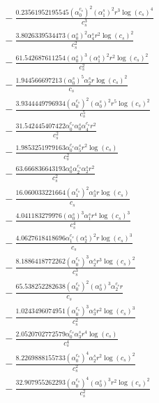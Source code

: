 \documentclass[10pt]{article}
\begin{document}
\begin{align*}
&{}  - \frac{0.23561952195545 \left(\alpha_{0}^{c_s}\right)^{2} \left(\alpha_{1}^s\right)^{2} r^{3} \log{\left(c_{s} \right)}^{4}}{c_{s}^{3}} \\
&{}  - \frac{3.8026339534473 \left(\alpha_{0}^s\right)^{2} \alpha_{4}^s r^{2} \log{\left(c_{s} \right)}^{2}}{c_{s}^{2}} \\
&{}  - \frac{61.542687611254 \left(\alpha_{0}^s\right)^{3} \left(\alpha_{1}^s\right)^{2} r^{2} \log{\left(c_{s} \right)}^{2}}{c_{s}^{2}} \\
&{}  - \frac{1.944566697213 \left(\alpha_{0}^s\right)^{5} \alpha_{2}^s r \log{\left(c_{s} \right)}^{2}}{c_{s}} \\
&{}  - \frac{3.9344449796934 \left(\alpha_{0}^{c_s}\right)^{2} \left(\alpha_{0}^s\right)^{2} r^{5} \log{\left(c_{s} \right)}^{2}}{c_{s}^{5}} \\
&{}  - \frac{31.542445407422 \alpha_{0}^{c_s} \alpha_{0}^s \alpha_{4}^{c_s} r^{2}}{c_{s}^{2}} \\
&{}  - \frac{1.9853251979163 \alpha_{0}^{c_s} \alpha_{5}^s r^{2} \log{\left(c_{s} \right)}}{c_{s}^{2}} \\
&{}  - \frac{63.666836643193 \alpha_{0}^s \alpha_{2}^{c_s} \alpha_{2}^s r^{2}}{c_{s}^{2}} \\
&{}  - \frac{16.060033221664 \left(\alpha_{1}^{c_s}\right)^{2} \alpha_{3}^s r \log{\left(c_{s} \right)}}{c_{s}} \\
&{}  - \frac{4.041183279976 \left(\alpha_{0}^s\right)^{3} \alpha_{1}^s r^{4} \log{\left(c_{s} \right)}^{3}}{c_{s}^{4}} \\
&{}  - \frac{4.0627618418696 \alpha_{1}^{c_s} \left(\alpha_{2}^s\right)^{2} r \log{\left(c_{s} \right)}^{3}}{c_{s}} \\
&{}  - \frac{8.1886418772262 \left(\alpha_{0}^{c_s}\right)^{3} \alpha_{2}^s r^{3} \log{\left(c_{s} \right)}^{2}}{c_{s}^{3}} \\
&{}  - \frac{65.538252282638 \left(\alpha_{0}^{c_s}\right)^{2} \left(\alpha_{0}^s\right)^{3} \alpha_{2}^{c_s} r}{c_{s}} \\
&{}  - \frac{1.0243496074951 \left(\alpha_{0}^{c_s}\right)^{3} \alpha_{3}^s r^{2} \log{\left(c_{s} \right)}^{3}}{c_{s}^{2}} \\
&{}  - \frac{2.0520702772579 \alpha_{0}^{c_s} \alpha_{3}^s r^{4} \log{\left(c_{s} \right)}}{c_{s}^{4}} \\
&{}  - \frac{8.2269888155733 \left(\alpha_{0}^{c_s}\right)^{4} \alpha_{2}^s r^{2} \log{\left(c_{s} \right)}^{2}}{c_{s}^{2}} \\
&{}  - \frac{32.907955262293 \left(\alpha_{0}^{c_s}\right)^{4} \left(\alpha_{0}^s\right)^{3} r^{2} \log{\left(c_{s} \right)}^{2}}{c_{s}^{2}} \\

\end{align*}
\end{document}

